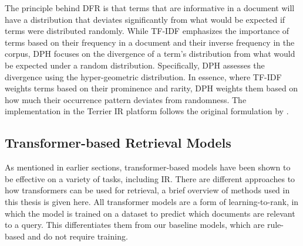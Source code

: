The principle behind DFR is that terms that are informative in a document will have a distribution that deviates significantly from what would be expected if terms were distributed randomly.
While TF-IDF emphasizes the importance of terms based on their frequency in a document and their inverse frequency in the corpus, DPH focuses on the divergence of a term's distribution from what would be expected under a random distribution.
Specifically, DPH assesses the divergence using the hyper-geometric distribution.
In essence, where TF-IDF weights terms based on their prominence and rarity, DPH weights them based on how much their occurrence pattern deviates from randomness.
The implementation in the Terrier IR platform follows the original formulation by \cite{amati:2006:Frequentist}.


\subsection{Transformer-based Retrieval Models}\label{sec:transformer-retrieval-models}
As mentioned in earlier sections, transformer-based models have been shown to be effective on a variety of tasks, including IR.
There are different approaches to how transformers can be used for retrieval, a brief overview of methods used in this thesis is given here.
All transformer models are a form of learning-to-rank, in which the model is trained on a dataset to predict which documents are relevant to a query.
This differentiates them from our baseline models, which are rule-based and do not require training.

